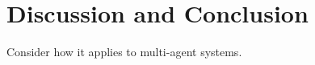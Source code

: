 \documentclass[twoside,twocolumn]{article}
\begin{document}

\section{Discussion and Conclusion}
Consider how it applies to multi-agent systems.\\



{}


\end{document}
